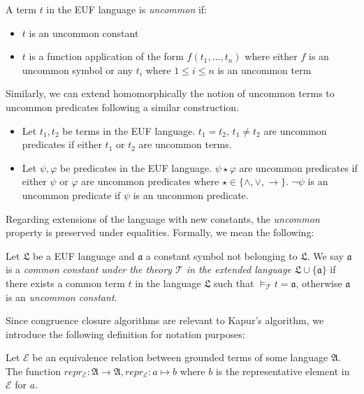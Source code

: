 \begin{definition}
  A term $t$ in the EUF language is \emph{uncommon} if:
  \begin{itemize}
    \item $t$ is an uncommon constant
    \item $t$ is a function application of the form $f(t_1, \dots, t_n)$
      where either $f$ is an uncommon symbol or any $t_i$ where $1 \leq i \leq n$ 
      is an uncommon term
  \end{itemize}

  Similarly, we can extend homomorphically the notion of uncommon terms to uncommon 
  predicates following a similar construction.

  \begin{itemize}
    \item Let $t_1, t_2$ be terms in the EUF language. $t_1 = t_2$,
      $t_1 \neq t_2$ are uncommon predicates if either $t_1$ or $t_2$
      are uncommon terms.
    \item Let $\psi, \varphi$ be predicates in the EUF language. 
      $\psi \star \varphi$ are uncommon predicates if either $\psi$
      or $\varphi$ are uncommon predicates where $\star \in \{ \land,
      \lor, \rightarrow \}$. $\neg \psi$ is an uncommon predicate if $\psi$
      is an uncommon predicate.

  \end{itemize}
\end{definition}


Regarding extensions of the language with new constants, the \emph{uncommon} property
is preserved under equalities. Formally, we mean the following:

\begin{definition}
  Let $\mathfrak{L}$ be a EUF language and $\mathfrak{a}$ a constant symbol
  not belonging to $\mathfrak{L}$. We say $\mathfrak{a}$ is a \emph{common constant under
  the theory $\mathcal{T}$ in the extended language $\mathfrak{L} \cup \{\mathfrak{a}\}$}
  if there exists a common term $t$ in the language $\mathfrak{L}$ such that 
  $\models_{\mathcal{T}} t = \mathfrak{a}$, otherwise $\mathfrak{a}$ is an \emph{
  uncommon constant}.
\end{definition}

Since congruence closure algorithms are relevant to Kapur's algorithm, we introduce the 
following definition for notation purposes:

\begin{definition}
  Let $\mathcal{E}$ be an equivalence relation between grounded terms of some 
  language $\mathfrak{A}$. The function $repr_{\mathcal{E}} : \mathfrak{A} \rightarrow 
  \mathfrak{A} , repr_{\mathcal{E}} : a \mapsto b$  where $b$ is the representative
  element in $\mathcal{E}$ for $a$.

\end{definition}

